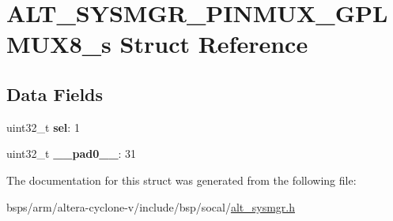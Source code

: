 \hypertarget{structALT__SYSMGR__PINMUX__GPLMUX8__s}{}\section{A\+L\+T\+\_\+\+S\+Y\+S\+M\+G\+R\+\_\+\+P\+I\+N\+M\+U\+X\+\_\+\+G\+P\+L\+M\+U\+X8\+\_\+s Struct Reference}
\label{structALT__SYSMGR__PINMUX__GPLMUX8__s}
\subsection*{Data Fields}
\begin{DoxyCompactItemize}
\item 
\mbox{\label{structALT__SYSMGR__PINMUX__GPLMUX8__s_afb94fc6f0b8b566ac9df68bc513c8115}} 
uint32\+\_\+t {\bfseries sel}\+: 1
\item 
\mbox{\label{structALT__SYSMGR__PINMUX__GPLMUX8__s_abf8a25d39d6071cfd8898ad1f838cb80}} 
uint32\+\_\+t {\bfseries \+\_\+\+\_\+pad0\+\_\+\+\_\+}\+: 31
\end{DoxyCompactItemize}


The documentation for this struct was generated from the following file\+:\begin{DoxyCompactItemize}
\item 
bsps/arm/altera-\/cyclone-\/v/include/bsp/socal/\mbox{\hyperlink{alt__sysmgr_8h}{alt\+\_\+sysmgr.\+h}}\end{DoxyCompactItemize}
